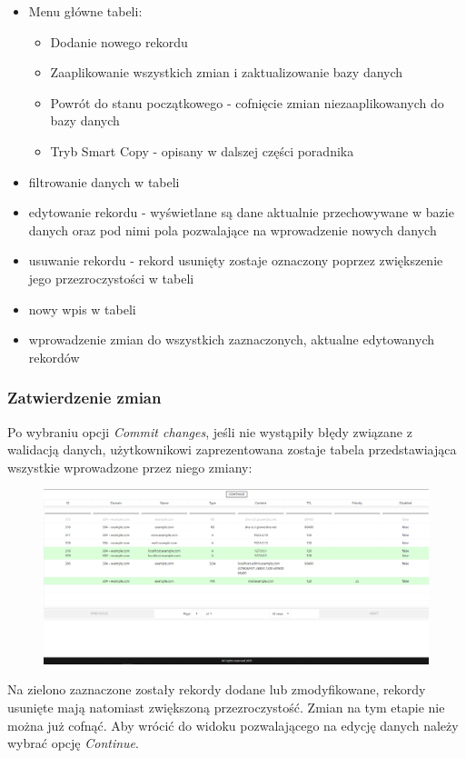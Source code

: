 \documentclass[12pt] {article}
\begin{document}
\begin{itemize}
\item \color{darkbrown} Menu główne tabeli:
\begin{itemize}
\item Dodanie nowego rekordu
\item Zaaplikowanie wszystkich zmian i zaktualizowanie bazy danych
\item Powrót do stanu początkowego - cofnięcie zmian niezaaplikowanych do bazy danych
\item Tryb Smart Copy - opisany w dalszej części poradnika
\end{itemize} \color{black}
\item \color{orange} filtrowanie danych w tabeli \color{black}
\item \color{ao} edytowanie rekordu - wyświetlane są dane aktualnie przechowywane w bazie danych oraz pod nimi pola pozwalające na wprowadzenie nowych danych \color{black}
\item \color{red} usuwanie rekordu - rekord usunięty zostaje oznaczony poprzez zwiększenie jego przezroczystości w tabeli \color{black}
\item \color{forestgreen(web)} nowy wpis w tabeli \color{black}
\item \color{black} wprowadzenie zmian do wszystkich zaznaczonych, aktualne edytowanych rekordów
\end{itemize}


\subsubsection{Zatwierdzenie zmian}
Po wybraniu opcji \emph{Commit changes}, jeśli nie wystąpiły błędy związane z walidacją danych, użytkownikowi zaprezentowana zostaje tabela przedstawiająca wszystkie wprowadzone przez niego zmiany:
\begin{figure}[H]
\centering
\includegraphics[width=\textwidth]{res/12_tabela_commit}
\end{figure} 
Na zielono zaznaczone zostały rekordy dodane lub zmodyfikowane, rekordy usunięte mają natomiast zwiększoną przezroczystość. Zmian na tym etapie nie można już cofnąć. Aby wrócić do widoku pozwalającego na edycję danych należy wybrać opcję \emph{Continue}.
\end{document}
